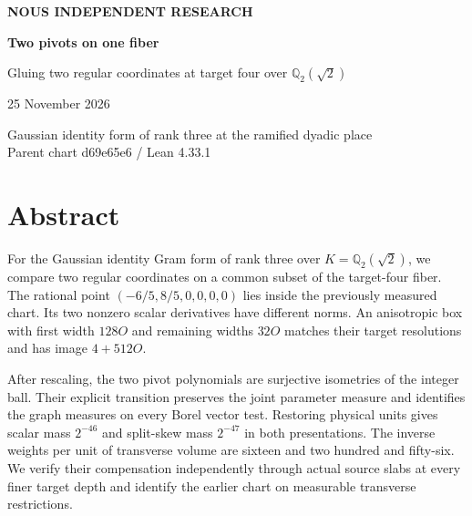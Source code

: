 \documentclass[12pt,letterpaper]{article}
\begin{document}
\thispagestyle{empty}
\begin{center}\vspace*{.46in}
{\sffamily\small\bfseries\color{accent}NOUS INDEPENDENT RESEARCH}\par\vspace{.51in}
{\fontsize{32}{38}\selectfont\bfseries\color{ink}Two pivots on one fiber}\par\vspace{.24in}
\begin{minipage}{.91\linewidth}\centering\Large Gluing two regular coordinates at target four over $\mathbb Q_2(\sqrt2)$\end{minipage}
\par\vspace{.35in}
\par\vspace{.45in}{\large Justin Candler with Uriel, AI research assistant}\par 25 November 2026
\end{center}\vfill
\begin{center}\small\sffamily Gaussian identity form of rank three at the ramified dyadic place\\
Parent chart d69e65e6 \enspace / \enspace Lean 4.33.1\end{center}
\clearpage
\section*{Abstract}
For the Gaussian identity Gram form of rank three over $K=\mathbb Q_2(\sqrt2)$, we compare two regular coordinates on a common subset of the target-four fiber. The rational point $(-6/5,8/5,0,0,0,0)$ lies inside the previously measured chart. Its two nonzero scalar derivatives have different norms. An anisotropic box with first width $128O$ and remaining widths $32O$ matches their target resolutions and has image $4+512O$.

After rescaling, the two pivot polynomials are surjective isometries of the integer ball. Their explicit transition preserves the joint parameter measure and identifies the graph measures on every Borel vector test. Restoring physical units gives scalar mass $2^{-46}$ and split-skew mass $2^{-47}$ in both presentations. The inverse weights per unit of transverse volume are sixteen and two hundred and fifty-six. We verify their compensation independently through actual source slabs at every finer target depth and identify the earlier chart on measurable transverse restrictions.
\end{document}
